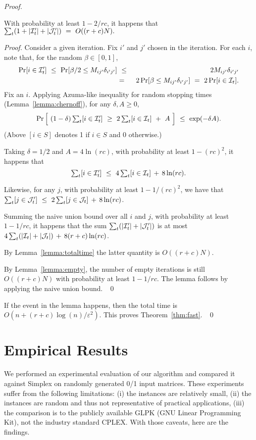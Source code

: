 \documentclass[11pt]{svjour3} \usepackage{fullpage}
\newcommand{\MM}{M}
\newcommand{\Ip}{\calI}
\newcommand{\Jd}{\calJ}
\newcommand{\dd}{\delta}
\newenvironment{Proof}{\begin{proof}}{{} ~\hfill\hfill\qed~\end{proof}}
\newcommand{\eps}{\varepsilon}
\newcommand{\calI}{{\cal I}}
\newcommand{\calJ}{{\cal J}}
\newcommand{\rows}{r}
\newcommand{\columns}{c}
\newcommand{\inputsize}{n}
\begin{document}
\begin{Proof}
\begin{lemma}\label{lemma:losetwo}
With probability at least $1-2/rc$,
it happens that
\(\sum_t (1+ |\Ip'_t| + |\Jd'_t|)~=~O((r+c)N).\)
\end{lemma}
\begin{Proof}
Consider a given iteration.  
Fix $i'$ and $j'$ chosen in the iteration.
For each $i$, note that, for the random $\beta\in[0,1]$,
\begin{eqnarray*}
\Pr[ i \in \Ip'_t ] 
~\le~
\Pr[ \beta/2 \le \MM_{ij'}\dd_{i'j'} ]
&~\le~&
2\MM_{ij'}\dd_{i'j'}
\\&=&
2\Pr[ \beta \le \MM_{ij'}\dd_{i'j'} ]
~=~
 2\Pr[i\in\Ip_t].
\end{eqnarray*}
Fix an $i$.
Applying Azuma-like inequality for random stopping times (Lemma~\ref{lemma:chernoff}),
for any $\delta,A\ge 0$,
\[\textstyle
\Pr\Big[~ (1-\delta) \sum_t [i\in\Ip'_t] ~\ge~ 2\sum_t [i\in\Ip_t] ~+~ A ~\Big]
~\le~\exp(-\delta A).
\]
(Above $[i\in S]$ denotes 1 if $i\in S$ and 0 otherwise.)

Taking $\delta=1/2$ and $A=4\ln(rc)$,
with probability at least $1-(rc)^2$,
it happens that
\[\textstyle
\sum_t [i\in\Ip'_t]~\le~ 4\sum_t [i\in\Ip_t] \,+\, 8\ln(rc).\]

Likewise, for any $j$, with probability at least $1-1/(rc)^2$,
we have that $\sum_t [j\in\Jd'_t] ~\le~2\sum_t [j\in\Jd_t] \,+\, 8\ln(rc)$.

Summing the naive union bound over all $i$ and $j$,
with probability at least $1-1/rc$,
it happens that the sum
$\sum_t ( |\Ip'_t| + |\Jd'_t|)$ 
is at most
$4\sum_t (|\Ip_t| + |\Jd_t|) \,+\, 8(r+c)\ln(rc)$.

By Lemma~\ref{lemma:totaltime} the latter quantity is $O((r+c)N)$.

By Lemma~\ref{lemma:empty},
the number of empty iterations is still
$O((r+c)N)$ with probability at least $1-1/rc$.
The lemma follows by applying the naive union bound.
\end{Proof}

If the event in the lemma happens, then the total time is
$O(\inputsize + (\rows+\columns)\log(\inputsize)/\eps^2)$.
This proves Theorem~\ref{thm:fast}.
\end{Proof}

\section{Empirical Results}\label{sec:experiments}

We performed an experimental evaluation of our algorithm
and compared it against Simplex on randomly generated 0/1 input matrices.
These experiments suffer from the following limitations:
(i) the instances are relatively small,
(ii) the instances are random and thus not representative of practical applications,
(iii) the comparison is to the publicly available GLPK (GNU Linear Programming Kit),
not the industry standard CPLEX.
With those caveats, here are the findings.
\end{document}
